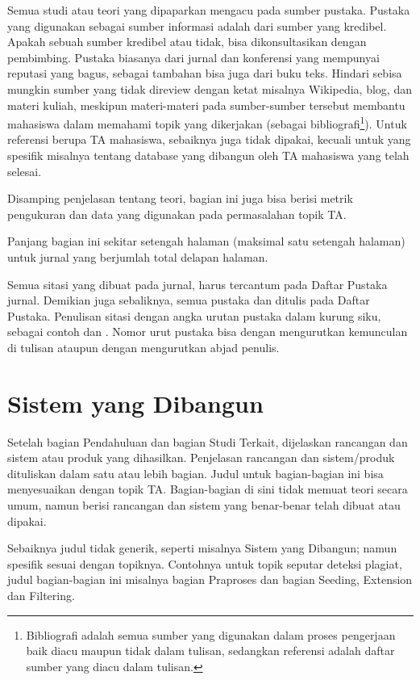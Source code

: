 Semua studi atau teori yang dipaparkan mengacu pada sumber pustaka. Pustaka yang digunakan sebagai sumber informasi adalah dari sumber yang kredibel. Apakah sebuah sumber kredibel atau tidak, bisa dikonsultasikan dengan pembimbing. Pustaka biasanya dari jurnal dan konferensi  yang mempunyai reputasi yang bagus, sebagai tambahan bisa juga dari buku teks. Hindari sebisa mungkin sumber yang tidak direview dengan ketat misalnya Wikipedia, blog, dan materi kuliah,  meskipun materi-materi pada sumber-sumber tersebut membantu mahasiswa dalam memahami topik yang dikerjakan (sebagai bibliografi\footnote{Bibliografi adalah semua sumber yang digunakan dalam proses pengerjaan baik diacu maupun tidak dalam tulisan, sedangkan referensi adalah daftar sumber yang diacu dalam tulisan.}).   Untuk referensi berupa TA mahasiswa, sebaiknya juga tidak dipakai, kecuali untuk yang spesifik misalnya tentang database yang dibangun oleh TA mahasiswa yang telah selesai.

Disamping penjelasan tentang teori, bagian ini juga bisa berisi metrik pengukuran dan data yang digunakan pada permasalahan topik TA. 

Panjang bagian ini sekitar setengah halaman (maksimal satu setengah halaman) untuk jurnal yang berjumlah total delapan halaman.

Semua sitasi yang dibuat pada jurnal, harus tercantum pada Daftar Pustaka jurnal. Demikian juga sebaliknya, semua pustaka dan ditulis pada Daftar Pustaka. Penulisan sitasi dengan angka urutan pustaka dalam kurung siku, sebagai contoh \citep{ochoa2003hybrid} dan \citep{van2002fundamentals,Budi}. Nomor urut pustaka bisa dengan mengurutkan kemunculan di tulisan ataupun dengan mengurutkan abjad penulis.

\section{Sistem yang Dibangun}

Setelah bagian Pendahuluan dan bagian Studi Terkait, dijelaskan rancangan dan sistem atau produk yang dihasilkan. Penjelasan rancangan dan sistem/produk dituliskan dalam satu atau lebih bagian. Judul untuk bagian-bagian ini bisa menyesuaikan dengan topik TA. Bagian-bagian di sini tidak memuat teori secara umum, namun berisi rancangan dan sistem yang benar-benar telah dibuat atau dipakai. 

Sebaiknya judul tidak generik, seperti misalnya Sistem yang Dibangun; namun spesifik sesuai dengan topiknya. Contohnya untuk topik seputar deteksi plagiat, judul bagian-bagian ini misalnya bagian Praproses dan bagian Seeding, Extension dan Filtering. 

